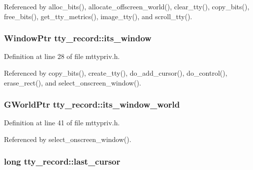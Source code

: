 Referenced by alloc\+\_\+bits(), allocate\+\_\+offscreen\+\_\+world(), clear\+\_\+tty(), copy\+\_\+bits(), free\+\_\+bits(), get\+\_\+tty\+\_\+metrics(), image\+\_\+tty(), and scroll\+\_\+tty().

\hypertarget{structtty__record_a96fac4cadd626dc4cfd9e0d3f64709a8}{
\subsubsection[{its\+\_\+window}]{\setlength{\rightskip}{0pt plus 5cm}Window\+Ptr tty\+\_\+record\+::its\+\_\+window}}\label{structtty__record_a96fac4cadd626dc4cfd9e0d3f64709a8}


Definition at line 28 of file mttypriv.\+h.



Referenced by copy\+\_\+bits(), create\+\_\+tty(), do\+\_\+add\+\_\+cursor(), do\+\_\+control(), erase\+\_\+rect(), and select\+\_\+onscreen\+\_\+window().

\hypertarget{structtty__record_ad4b8e1a3473cbb12a1a5546d5cd5c56d}{
\subsubsection[{its\+\_\+window\+\_\+world}]{\setlength{\rightskip}{0pt plus 5cm}G\+World\+Ptr tty\+\_\+record\+::its\+\_\+window\+\_\+world}}\label{structtty__record_ad4b8e1a3473cbb12a1a5546d5cd5c56d}


Definition at line 41 of file mttypriv.\+h.



Referenced by select\+\_\+onscreen\+\_\+window().

\hypertarget{structtty__record_a405d044b9dbbc32f14664799612233f6}{
\subsubsection[{last\+\_\+cursor}]{\setlength{\rightskip}{0pt plus 5cm}long tty\+\_\+record\+::last\+\_\+cursor}}\label{structtty__record_a405d044b9dbbc32f14664799612233f6}


